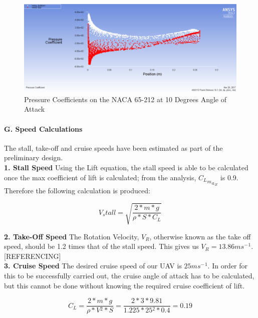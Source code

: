 \documentclass[12pt]{article}
\begin{document}
\begin{figure}[H]
    \includegraphics[width=18cm, scale=1]{pressurecoeff.png}
    \centering
    \caption{Pressure Coefficients on the NACA 65-212 at 10 Degrees Angle of Attack}
    \label{fig:pressurecoeff}
\end{figure}

\paragraph{G. Speed Calculations} The stall, take-off and cruise speeds have been estimated as part of the preliminary design. \\

\noindent \textbf{1. Stall Speed}
\noindent Using the Lift equation, the stall speed is able to be calculated once the max coefficient of lift is calculated; from the analysis, $C{{{{{_L}_m}_a}_x}}$ is 0.9. Therefore the following calculation is produced:

\begin{equation} \label{eq}
V{_stall} = \sqrt{\frac{2*m*g}{\rho *S* C{_L}}}
\end{equation}

\noindent \textbf{2. Take-Off Speed}
\noindent The Rotation Velocity, $V{_R}$, otherwise known as the take off speed, should be 1.2 times that of the stall speed. This gives us $V{_R} = 13.86ms{{^-}^1}$.[REFERENCING] \\

\noindent \textbf{3. Cruise Speed}
\noindent The desired cruise speed of our UAV is $25ms{{^-}^1}$. In order for this to be successfully carried out, the cruise angle of attack has to be calculated, but this cannot be done without knowing the required cruise coefficient of lift.

\begin{equation} \label{eq}
C{_L} = \frac{2*m*g}{\rho * V{^2}*S} = \frac{2*3*9.81}{1.225*25{^2}*0.4} =0.19
\end{equation}
\end{document}
